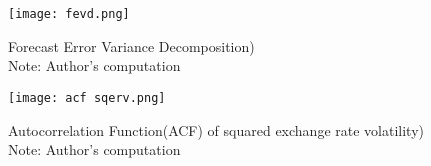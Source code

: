 \documentclass{article} %
\begin{document}
\begin{figure}[h] %
  \centering
  \texttt{[image: fevd.png]} %
  \caption{Forecast Error Variance Decomposition)\\ Note: Author's computation }
  \label{fig:fevd} %
\end{figure}

\begin{figure}[h] %
  \centering
  \texttt{[image: acf sqerv.png]} %
  \caption{Autocorrelation Function(ACF) of squared exchange rate volatility)\\ Note: Author's computation }
  \label{fig:acf} %
\end{figure}
\end{document}
